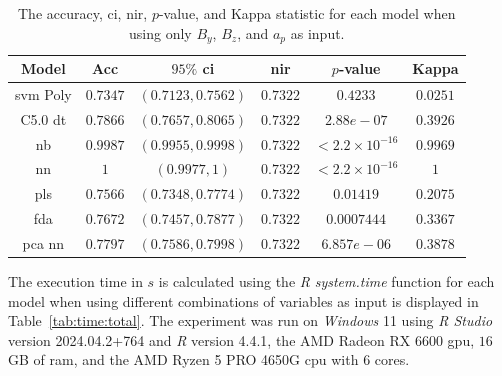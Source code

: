 \documentclass[sn-mathphys-num]{sn-jnl}%
\begin{document}
\begin{table}[!ht]
    \centering
    \caption{The accuracy, \acrshort{ci}, \acrshort{nir}, $p$-value, and Kappa statistic for each model when using only $B_{y}$, $B_{z}$, and $a_{p}$ as input.}
	\label{tab:stats:reverse:yzap}
	\begin{tabular}{|c|c|c|c|c|c|}
		\hline
		Model & Acc & $95\%$ \acrshort{ci} & \acrshort{nir} & $p$-value & Kappa \\ \hline
		\acrshort{svm} Poly & $0.7347$ & $(0.7123, 0.7562)$ & $0.7322$ & $0.4233$ & $0.0251$ \\ \hline
		C5.0 \acrshort{dt} & $0.7866$ & $(0.7657, 0.8065)$ & $0.7322$ & $2.88e-07$ & $0.3926$ \\ \hline
		\acrshort{nb} & $0.9987$ & $(0.9955, 0.9998)$ & $0.7322$ & $< 2.2 \times {10}^{-16}$ & $0.9969$ \\ \hline
		\acrshort{nn} & $1$ & $(0.9977, 1)$ & $0.7322$ & $< 2.2 \times {10}^{-16}$ & $1$ \\ \hline
		\acrshort{pls} & $0.7566$ & $(0.7348, 0.7774)$ & $0.7322$ & $0.01419$ & $0.2075$ \\ \hline
		\acrshort{fda} & $0.7672$ & $(0.7457, 0.7877)$ & $0.7322$ & $0.0007444$ & $0.3367$ \\ \hline
		\acrshort{pca} \acrshort{nn} & $0.7797$ & $(0.7586, 0.7998)$ & $0.7322$ & $6.857e-06$ & $0.3878$ \\ \hline
	\end{tabular}
\end{table}

The execution time in $s$ is calculated using the \textit{R} \textit{system.time} function \cite{system.time2024} for each model when using different combinations of variables as input is displayed in Table~\ref{tab:time:total}. The experiment was run on \textit{Windows} 11 using \textit{R Studio} version 2024.04.2+764 and \textit{R} version 4.4.1, the AMD Radeon RX 6600 \acrfull{gpu}, $16$ GB of \acrfull{ram}, and the AMD Ryzen 5 PRO 4650G \acrfull{cpu} with $6$ cores.
\end{document}
